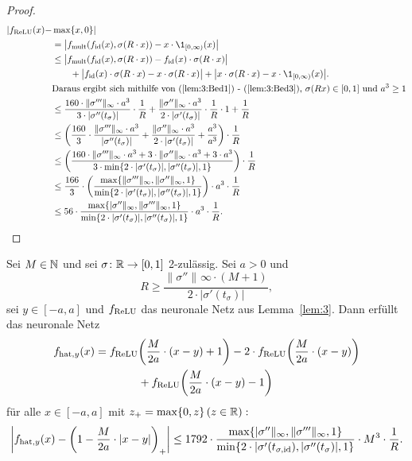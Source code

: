 \begin{proof}
\begin{equation*}
\begin{split}
|f_{\ReLU}(x) - & \max\{x, 0\}|  \\
& = \big| f_{\mult}(f_{\id}(x), \sigma(R \cdot x)) - x \cdot \1_{[0, \infty)}(x)\big| \\
& \leq \big| f_{\mult}(f_{\id}(x), \sigma(R \cdot x)) - f_{\id}(x)\cdot\sigma(R \cdot x)\big| \\
& \qquad + \big| f_{\id}(x)\cdot\sigma(R \cdot x) - x \cdot \sigma(R \cdot x)\big| + \big| x \cdot \sigma(R \cdot x) - x \cdot \1_{[0, \infty)}(x)\big|. \\
& \text{Daraus ergibt sich mithilfe von (\ref{lem:3:Bed1}) - (\ref{lem:3:Bed3}), $\sigma(Rx) \in [0, 1]$ und $a^3 \geq 1$}\\
& \leq \frac{160 \cdot \|\sigma'''\|_{\infty} \cdot a ^3}{3 \cdot |\sigma''(t_{\sigma})|} \cdot \frac{1}{R} + \frac{\|\sigma''\|_{\infty} \cdot a^3}{2 \cdot |\sigma'(t_{\sigma})|} \cdot \frac{1}{R} \cdot 1+ \frac{1}{R} \\
& \leq \bigg(\frac{160}{3} \cdot \frac{\|\sigma'''\|_{\infty} \cdot a ^3}{|\sigma''(t_{\sigma})|} + \frac{\|\sigma''\|_{\infty} \cdot a^3}{2 \cdot |\sigma'(t_{\sigma})|} + \frac{a^3}{a^3} \bigg) \cdot \frac{1}{R} \\ 
& \leq \bigg(\frac{160 \cdot\|\sigma'''\|_{\infty} \cdot a ^3 + 3 \cdot \|\sigma''\|_{\infty} \cdot a^3 + 3 \cdot a^3}{3 \cdot \min\{ 2 \cdot |\sigma'(t_{\sigma})|, |\sigma''(t_{\sigma})|, 1\}}\bigg) \cdot \frac{1}{R}\\
& \leq \frac{166}{3} \cdot \bigg(\frac{\max\{\|\sigma'''\|_{\infty}, \|\sigma''\|_{\infty} , 1\}}{\min\{ 2 \cdot |\sigma'(t_{\sigma})|, |\sigma''(t_{\sigma})|, 1\}}\bigg) \cdot a^3 \cdot  \frac{1}{R} \\
& \leq 56 \cdot \frac{\max\{|\sigma''\|_{\infty}, \|\sigma'''\|_{\infty}, 1\}}{\min\{2 \cdot |\sigma'(t_{\sigma})|, |\sigma''(t_{\sigma})|, 1\}} \cdot a^3 \cdot \frac{1}{R}.
\end{split}
\end{equation*}
  \end{proof}
  \begin{lem}
  \label{lem:4}
  Sei $M \in \mathbb{N}$ und sei $\sigma\colon \mathbb{R} \to [0, 1]$ 2-zulässig. Sei $a > 0$ und $$R \geq \frac{\|\sigma''\|_{}\infty \cdot (M + 1)}{2 \cdot |\sigma'(t_{\sigma})|},$$ sei $y \in [-a, a]$ und $f_{\mathrm{ReLU}}$ das neuronale Netz aus Lemma~\ref{lem:3}. Dann erfüllt das neuronale Netz 
  \begin{equation*}
  \begin{split}
  f_{\mathrm{hat},y}(x) = f_{\mathrm{ReLU}}& \bigg(\frac{M}{2a} \cdot (x - y) + 1\bigg) - 2 \cdot f_{\mathrm{ReLU}}\bigg(\frac{M}{2a} \cdot (x - y)\bigg) \\ &+ f_{\mathrm{ReLU}}\bigg(\frac{M}{2a} \cdot (x - y) - 1\bigg)
  \end{split}
  \end{equation*}
  für alle $x \in [-a ,a]$ mit $z_+ = \max\{0, z\} \, (z \in \mathbb{R}):$   
  $$\bigg|f_{\mathrm{hat},y}(x) - \bigg(1 - \frac{M}{2a} \cdot |x - y|\bigg)_+\bigg| \leq 1792 \cdot \frac{\max\{|\sigma''\|_{\infty}, \|\sigma'''\|_{\infty}, 1\}}{\min\{2 \cdot |\sigma'(t_{\sigma, \mathrm{id}}), |\sigma''(t_{\sigma})|, 1\}} \cdot M^3 \cdot \frac{1}{R}.$$
  \end{lem}
